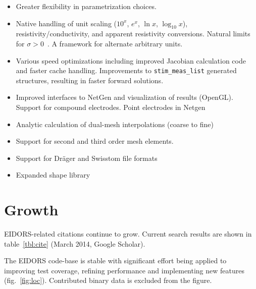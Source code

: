 \documentclass[10pt,a4paper]{article}
\begin{document}
\begin{multicols}{2}
\begin{itemize}
\item Greater flexibility in parametrization choices.

\item Native handling of unit scaling ($10^x$, $e^x$, $\ln x$, $\log_{10} x$), resistivity/conductivity, and apparent resistivity conversions.
  Natural limits for $\sigma > 0$~\cite{polydorides2014}.
  A framework for alternate arbitrary units.

\item Various speed optimizations including improved Jacobian calculation code and faster cache handling.
  Improvements to {\tt stim\_meas\_list} generated structures, resulting in
  faster forward solutions.


\item Improved interfaces to NetGen and visualization of results (OpenGL).
      Support for compound electrodes.
      Point electrodes in Netgen

\item Analytic calculation of dual-mesh interpolations (coarse to fine)

\item Support for second and third order mesh elements.

\item Support for Dr\"ager and Swisstom file formats

\item Expanded shape library
\end{itemize}

\section{Growth}
EIDORS-related citations continue to grow. Current search results are
shown in table~\ref{tbl:cite} (March 2014, Google Scholar).

The EIDORS code-base is stable with significant effort being applied to
improving test coverage, refining performance and implementing new features
(fig.~\ref{fig:loc}). Contributed binary data is excluded from the figure.


\end{multicols}
\end{document}
